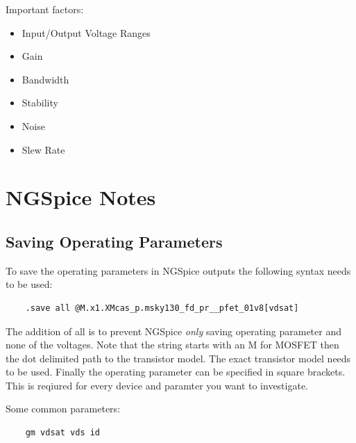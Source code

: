 \documentclass[11pt]{article}
\begin{document}
Important factors:

\begin{itemize}
  \item Input/Output Voltage Ranges
  \item Gain
  \item Bandwidth
  \item Stability
  \item Noise
  \item Slew Rate
\end{itemize}

\newpage
\section{NGSpice Notes}

\subsection{Saving Operating Parameters}

To save the operating parameters in NGSpice outputs the following syntax needs to be used:

\begin{lstlisting}
    .save all @M.x1.XMcas_p.msky130_fd_pr__pfet_01v8[vdsat]
\end{lstlisting}

The addition of all is to prevent NGSpice \textit{only} saving operating parameter and none of the voltages. Note that the string starts with an M for MOSFET then the dot delimited path to the transistor model. The exact transistor model needs to be used. Finally the operating parameter can be specified in square brackets. This is reqiured for every device and paramter you want to investigate.

Some common parameters:

\begin{lstlisting}
    gm vdsat vds id
\end{lstlisting}
\end{document}
